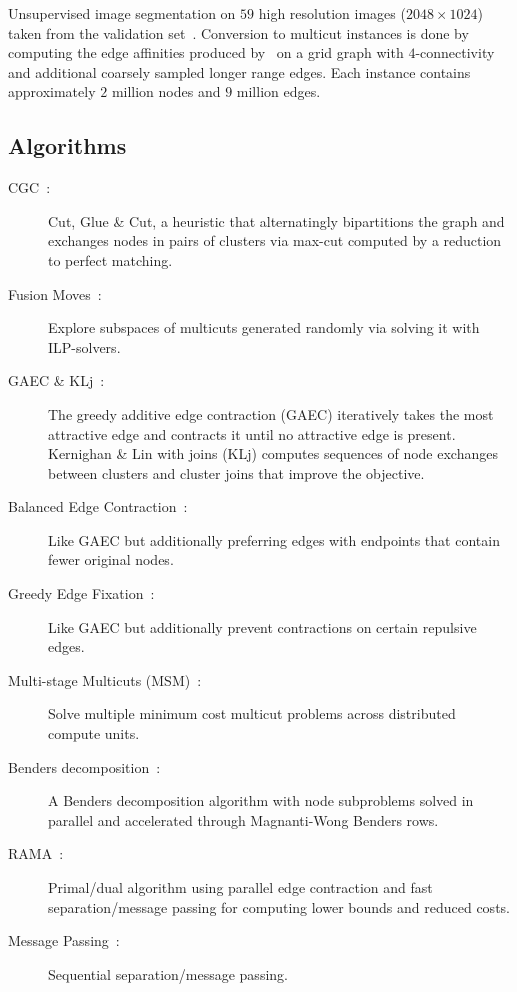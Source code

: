 Unsupervised image segmentation on $59$ high resolution images ($2048 \times 1024$) taken from the validation set~\cite{cordts2016cityscapes}.
Conversion to multicut instances is done by computing the edge affinities produced by~\cite{abbas2021combinatorial} on a grid graph with $4$-connectivity and additional coarsely sampled longer range edges.
Each instance contains approximately $2$ million nodes and $9$ million edges. 

\subsection{Algorithms}
\begin{description}
\item[CGC~\cite{beier2014cut}:] Cut, Glue \& Cut, a heuristic that alternatingly bipartitions the graph and exchanges nodes in pairs of clusters via max-cut computed by a reduction to perfect matching.
\item[Fusion Moves~\cite{beier2017multicut}:] Explore subspaces of multicuts generated randomly via solving it with ILP-solvers.
\item[GAEC \& KLj~\cite{keuper2015efficient}:] The greedy additive edge contraction (GAEC) iteratively takes the most attractive edge and contracts it until no attractive edge is present.
Kernighan \& Lin with joins (KLj) computes sequences of node exchanges between clusters and cluster joins that improve the objective.
\item[Balanced Edge Contraction~\cite{kardoost2018solving}:] Like GAEC but additionally preferring edges with endpoints that contain fewer original nodes.
\item[Greedy Edge Fixation~\cite{levinkov2019comparative}:] Like GAEC but additionally prevent contractions on certain repulsive edges.
\item[Multi-stage Multicuts (MSM)~\cite{ho2021msm}:] Solve multiple minimum cost multicut problems across distributed compute units.
\item[Benders decomposition~\cite{lukasik2020benders}:] A Benders decomposition algorithm with node subproblems solved in parallel and accelerated through Magnanti-Wong Benders rows.
\item[RAMA~\cite{abbas2021combinatorial}:] Primal/dual algorithm using parallel edge contraction and fast separation/message passing for computing lower bounds and reduced costs.
\item[Message Passing~\cite{swoboda2017message}:] Sequential separation/message passing.

\end{description}
